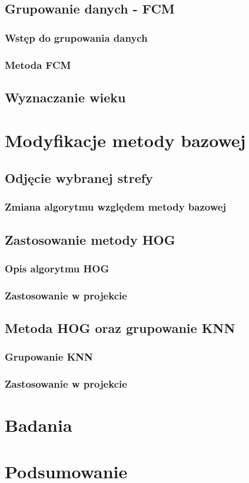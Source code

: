 \section{Grupowanie danych - FCM}\label{sec:grupowanieDanych}
\subsection{Wstęp do grupowania danych}
\subsection{Metoda FCM}
\section{Wyznaczanie wieku}\label{sec:wyznaczanieWieku}


\chapter{Modyfikacje metody bazowej}

\section{Odjęcie wybranej strefy}
\subsection{Zmiana algorytmu względem metody bazowej}
\section{Zastosowanie metody HOG}
\subsection{Opis algorytmu HOG}
\subsection{Zastosowanie w projekcie}

\section{Metoda HOG oraz grupowanie KNN}
\subsection{Grupowanie KNN}
\subsection{Zastosowanie w projekcie}
\chapter{Badania}

\chapter{Podsumowanie}
